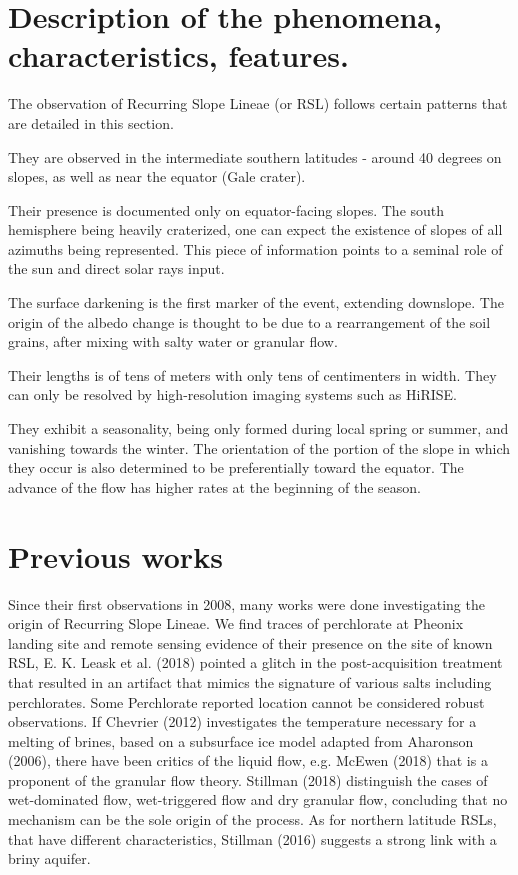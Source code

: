 \documentclass{report}
\begin{document}
\section{Description of the phenomena, characteristics, features.}
The observation of Recurring Slope Lineae (or RSL) follows certain patterns that are detailed in this section.

They are observed in the intermediate southern latitudes - around 40 degrees on slopes, as well as near the equator (Gale crater). 

Their presence is documented only on equator-facing slopes. The south hemisphere being heavily craterized, one can expect the existence of slopes of all azimuths being represented. This piece of information points to a seminal role of the sun and direct solar rays input. 

The surface darkening is the first marker of the event, extending downslope. The origin of the albedo change is thought to be due to a rearrangement of the soil grains, after mixing with salty water or granular flow.  

Their lengths is of tens of meters with only tens of centimenters in width. They can only be resolved by high-resolution imaging systems such as HiRISE. 

They exhibit a seasonality, being only formed during local spring or summer, and vanishing towards the winter.
The orientation of the portion of the slope in which they occur is also determined to be preferentially toward the equator. 
The advance of the flow has higher rates at the beginning of the season.

\section{Previous works}

Since their first observations in 2008, many works were done investigating the origin of Recurring Slope Lineae.
We find traces of perchlorate at Pheonix landing site and remote sensing evidence of their presence on the site of known RSL, E. K. Leask et al. (2018) pointed a glitch in the post-acquisition treatment that resulted in an artifact that mimics the signature of various salts including perchlorates. Some Perchlorate reported location cannot be considered robust observations.  
If Chevrier (2012) investigates the temperature necessary for a melting of brines, based on a subsurface ice model adapted from Aharonson (2006), there have been critics of the liquid flow, e.g. McEwen (2018) that is a proponent of the granular flow theory. Stillman (2018) distinguish the cases of wet-dominated flow, wet-triggered flow and dry granular flow, concluding that no mechanism can be the sole origin of the process. 
As for northern latitude RSLs, that have different characteristics, Stillman (2016) suggests a strong link with a briny aquifer.  
\end{document}
